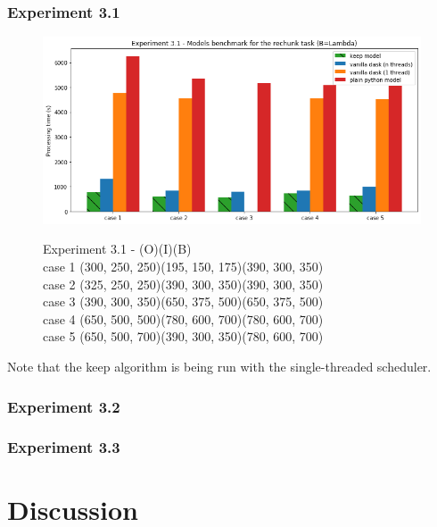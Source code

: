 \documentclass[conference]{IEEEtran}
\begin{document}
\subsubsection{Experiment 3.1}
\begin{figure}
  \centering
  \includegraphics[scale=0.5]{./figures/exp5_1_results.png}
  \label{fig:exp3_1}
  \caption{Experiment 3.1  - (O)(I)(B)\\
  case 1 (300, 250, 250)(195, 150, 175)(390, 300, 350)\\
  case 2 (325, 250, 250)(390, 300, 350)(390, 300, 350)\\
  case 3 (390, 300, 350)(650, 375, 500)(650, 375, 500)\\
  case 4 (650, 500, 500)(780, 600, 700)(780, 600, 700)\\
  case 5 (650, 500, 700)(390, 300, 350)(780, 600, 700)\\
  }
\end{figure}

Note that the keep algorithm is being run with the single-threaded scheduler.

\subsubsection{Experiment 3.2}
\subsubsection{Experiment 3.3}

\section{Discussion}
\end{document}
